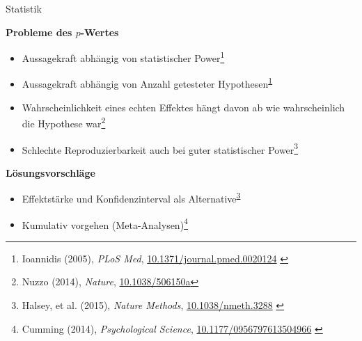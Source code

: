 \documentclass{beamer}
\begin{document}
\begin{frame}{Statistik}

    \textbf{Probleme des $p$-Wertes}
    \begin{itemize}
        \item Aussagekraft abhängig von statistischer Power\footnote{%
            Ioannidis (2005), \emph{PLoS Med},
            \href{https://doi.org/10.1371/journal.pmed.0020124}{10.1371/journal.pmed.0020124}%
            \label{Ioannidis2005}}
        \item Aussagekraft abhängig von Anzahl getesteter
            Hypothesen\textsuperscript{\ref*{Ioannidis2005}}
        \item Wahrscheinlichkeit eines echten Effektes hängt davon ab wie
            wahrscheinlich die Hypothese war\footnote{%
            Nuzzo (2014), \emph{Nature},
            \href{https://doi.org/10.1038/506150a}{10.1038/506150a}}
        \item Schlechte Reproduzierbarkeit auch bei guter statistischer
            Power\footnote{%
            Halsey, et al. (2015), \emph{Nature Methods},
            \href{https://doi.org/10.1038/nmeth.3288}{10.1038/nmeth.3288}%
            \label{Halsey2015}}
    \end{itemize}
    \vspace{0.5cm}
    \textbf{Lösungsvorschläge}
    \begin{itemize}
        \item Effektstärke und Konfidenzinterval als
            Alternative\textsuperscript{\ref*{Halsey2015}}
        \item Kumulativ vorgehen (Meta-Analysen)\footnote{%
            Cumming (2014), \emph{Psychological Science},
            \href{https://doi.org/10.1177/0956797613504966}{10.1177/0956797613504966}%
            \label{Cumming2014}}
    \end{itemize}

\end{frame}
\end{document}
